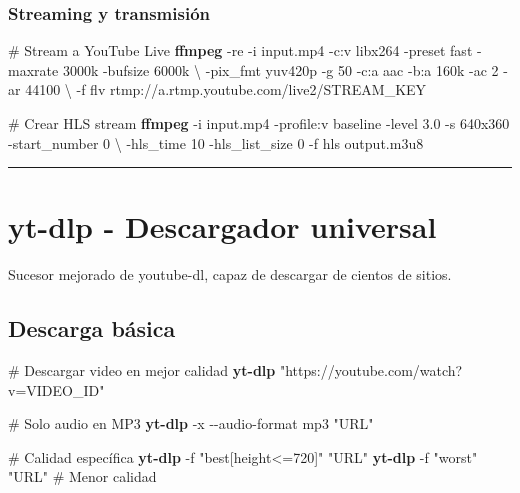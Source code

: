 \documentclass[
  11pt,
  letterpaper,
  oneside,
  openany]{scrbook}
\newenvironment{Shaded}{}{}
\newcommand{\AttributeTok}[1]{\textcolor[rgb]{0.84,0.23,0.29}{#1}}
\newcommand{\CommentTok}[1]{\textcolor[rgb]{0.42,0.45,0.49}{#1}}
\newcommand{\DataTypeTok}[1]{\textcolor[rgb]{0.84,0.23,0.29}{#1}}
\newcommand{\ExtensionTok}[1]{\textcolor[rgb]{0.84,0.23,0.29}{\textbf{#1}}}
\newcommand{\NormalTok}[1]{\textcolor[rgb]{0.14,0.16,0.18}{#1}}
\newcommand{\StringTok}[1]{\textcolor[rgb]{0.01,0.18,0.38}{#1}}
\begin{document}
\subsubsection{Streaming y
transmisión}\label{streaming-y-transmisiuxf3n}

\begin{Shaded}
\begin{Highlighting}[]
\CommentTok{\# Stream a YouTube Live}
\ExtensionTok{ffmpeg} \AttributeTok{{-}re} \AttributeTok{{-}i}\NormalTok{ input.mp4 }\AttributeTok{{-}c:v}\NormalTok{ libx264 }\AttributeTok{{-}preset}\NormalTok{ fast }\AttributeTok{{-}maxrate}\NormalTok{ 3000k }\AttributeTok{{-}bufsize}\NormalTok{ 6000k }\DataTypeTok{\textbackslash{}}
\NormalTok{{-}pix\_fmt yuv420p }\AttributeTok{{-}g}\NormalTok{ 50 }\AttributeTok{{-}c:a}\NormalTok{ aac }\AttributeTok{{-}b:a}\NormalTok{ 160k }\AttributeTok{{-}ac}\NormalTok{ 2 }\AttributeTok{{-}ar}\NormalTok{ 44100 }\DataTypeTok{\textbackslash{}}
\NormalTok{{-}f flv rtmp://a.rtmp.youtube.com/live2/STREAM\_KEY}

\CommentTok{\# Crear HLS stream}
\ExtensionTok{ffmpeg} \AttributeTok{{-}i}\NormalTok{ input.mp4 }\AttributeTok{{-}profile:v}\NormalTok{ baseline }\AttributeTok{{-}level}\NormalTok{ 3.0 }\AttributeTok{{-}s}\NormalTok{ 640x360 }\AttributeTok{{-}start\_number}\NormalTok{ 0 }\DataTypeTok{\textbackslash{}}
\NormalTok{{-}hls\_time 10 }\AttributeTok{{-}hls\_list\_size}\NormalTok{ 0 }\AttributeTok{{-}f}\NormalTok{ hls output.m3u8}
\end{Highlighting}
\end{Shaded}

\begin{center}\rule{0.5\linewidth}{0.5pt}\end{center}

\section{yt-dlp - Descargador universal}\label{sec-yt-dlp}

Sucesor mejorado de youtube-dl, capaz de descargar de cientos de sitios.

\subsection{Descarga básica}\label{descarga-buxe1sica}

\begin{Shaded}
\begin{Highlighting}[]
\CommentTok{\# Descargar video en mejor calidad}
\ExtensionTok{yt{-}dlp} \StringTok{"https://youtube.com/watch?v=VIDEO\_ID"}

\CommentTok{\# Solo audio en MP3}
\ExtensionTok{yt{-}dlp} \AttributeTok{{-}x} \AttributeTok{{-}{-}audio{-}format}\NormalTok{ mp3 }\StringTok{"URL"}

\CommentTok{\# Calidad específica}
\ExtensionTok{yt{-}dlp} \AttributeTok{{-}f} \StringTok{"best[height\textless{}=720]"} \StringTok{"URL"}
\ExtensionTok{yt{-}dlp} \AttributeTok{{-}f} \StringTok{"worst"} \StringTok{"URL"}  \CommentTok{\# Menor calidad}
\end{Highlighting}
\end{Shaded}
\end{document}
